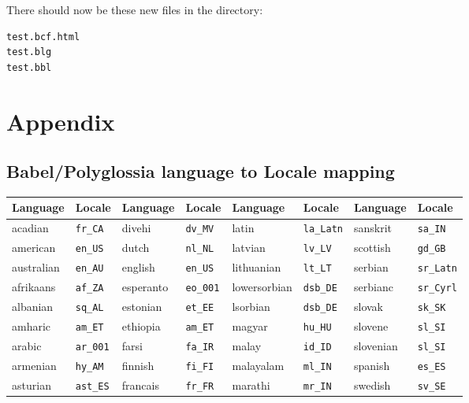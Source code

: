 \documentclass{ltxdockit}
\begin{document}
\noindent There should now be these new files in the directory:

\begin{verbatim}
test.bcf.html
test.blg
test.bbl
\end{verbatim}

\appendix
\section{Appendix}
\subsection{Babel/Polyglossia language to Locale mapping}\label{localemap}

\begin{center}
\footnotesize
\begin{tabular}{alalalal}
\toprule
Language & Locale & Language & Locale & Language & Locale & Language & Locale\\
\midrule
acadian    & \texttt{fr\_CA}  & divehi      & \texttt{dv\_MV}  & latin           & \texttt{la\_Latn} & sanskrit        & \texttt{sa\_IN}\\
american   & \texttt{en\_US}  & dutch       & \texttt{nl\_NL}  & latvian         & \texttt{lv\_LV} &   scottish        & \texttt{gd\_GB}\\
australian & \texttt{en\_AU}  & english     & \texttt{en\_US}  & lithuanian      & \texttt{lt\_LT} &   serbian         & \texttt{sr\_Latn}\\ 
afrikaans  & \texttt{af\_ZA}  & esperanto   & \texttt{eo\_001} & lowersorbian    & \texttt{dsb\_DE} &  serbianc        & \texttt{sr\_Cyrl}\\ 
albanian   & \texttt{sq\_AL}  & estonian    & \texttt{et\_EE}  & lsorbian        & \texttt{dsb\_DE} &  slovak          & \texttt{sk\_SK}\\
amharic    & \texttt{am\_ET}  & ethiopia    & \texttt{am\_ET}  & magyar          & \texttt{hu\_HU} &   slovene         & \texttt{sl\_SI}\\
arabic     & \texttt{ar\_001} & farsi       & \texttt{fa\_IR}  & malay           & \texttt{id\_ID} &   slovenian       & \texttt{sl\_SI}\\
armenian   & \texttt{hy\_AM}  & finnish     & \texttt{fi\_FI}  & malayalam       & \texttt{ml\_IN} &   spanish         & \texttt{es\_ES}\\
asturian   & \texttt{ast\_ES} & francais    & \texttt{fr\_FR}  & marathi         & \texttt{mr\_IN} &   swedish         & \texttt{sv\_SE}\\

\end{tabular}
\end{center}
\end{document}
